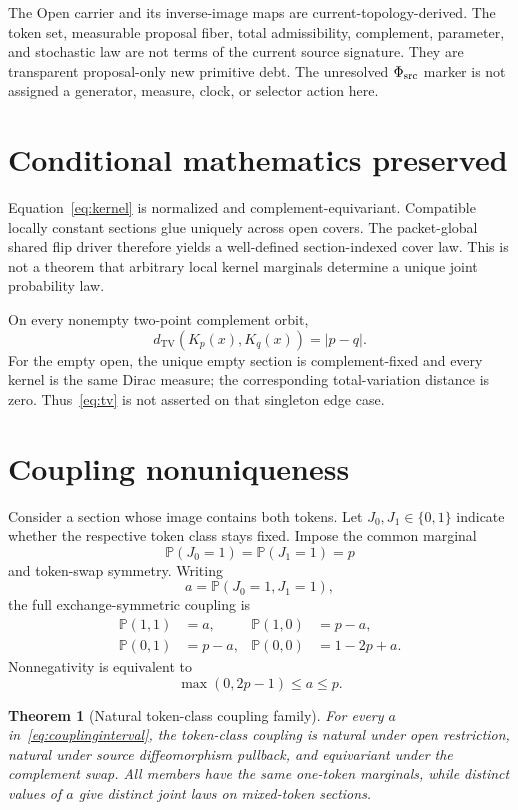 \documentclass[11pt]{article}
\newtheorem{theorem}{Theorem}
\newcommand{\TV}{\operatorname{TV}}
\begin{document}
The Open carrier and its inverse-image maps are current-topology-derived. The
token set, measurable proposal fiber, total admissibility, complement,
parameter, and stochastic law are not terms of the current source signature.
They are transparent proposal-only new primitive debt. The unresolved
$\Phi_{\rm src}$ marker is not assigned a generator, measure, clock, or
selector action here.

\section{Conditional mathematics preserved}

Equation~\eqref{eq:kernel} is normalized and complement-equivariant. Compatible
locally constant sections glue uniquely across open covers. The packet-global
shared flip driver therefore yields a well-defined section-indexed cover law.
This is not a theorem that arbitrary local kernel marginals determine a unique
joint probability law.

On every nonempty two-point complement orbit,
\begin{equation}
 d_{\TV}(K_p(x),K_q(x))=|p-q|.
 \label{eq:tv}
\end{equation}
For the empty open, the unique empty section is complement-fixed and every
kernel is the same Dirac measure; the corresponding total-variation distance
is zero. Thus~\eqref{eq:tv} is not asserted on that singleton edge case.

\section{Coupling nonuniqueness}

Consider a section whose image contains both tokens. Let $J_0,J_1\in\{0,1\}$
indicate whether the respective token class stays fixed. Impose the common
marginal
\[
  \mathbb P(J_0=1)=\mathbb P(J_1=1)=p
\]
and token-swap symmetry. Writing
\[
  a=\mathbb P(J_0=1,J_1=1),
\]
the full exchange-symmetric coupling is
\begin{align*}
 \mathbb P(1,1)&=a,&
 \mathbb P(1,0)&=p-a,\\
 \mathbb P(0,1)&=p-a,&
 \mathbb P(0,0)&=1-2p+a.
\end{align*}
Nonnegativity is equivalent to
\begin{equation}
  \max(0,2p-1)\le a\le p.
  \label{eq:couplinginterval}
\end{equation}

\begin{theorem}[Natural token-class coupling family]
For every $a$ in~\eqref{eq:couplinginterval}, the token-class coupling is
natural under open restriction, natural under source diffeomorphism pullback,
and equivariant under the complement swap. All members have the same
one-token marginals, while distinct values of $a$ give distinct joint laws on
mixed-token sections.
\end{theorem}
\end{document}
